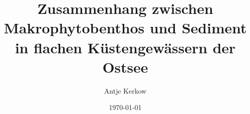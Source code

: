 



\pagestyle{empty}



\titlehead{Ernst Moritz Arndt Universität Greifswald\\
           Fachbereich Naturwissenschaften\\
           Institut für Landschaftsökologie und Naturschutz}

\subject{Diplomarbeit}

\title{Zusammenhang zwischen Makrophytobenthos und Sediment in flachen Küstengewässern der Ostsee}

\author{Antje Kerkow}

\date{\today} 

\publishers{Dozenten:\\PD Dr. Irmgard Blindow \\Prof. Dr. Hendrik Schubert}





\maketitle %
\clearpage


\pagestyle{scrheadings}    %
\clearscrheadfoot

\cfoot{\pagemark}
\chead{\headmark}


\tableofcontents

\newpage

\listoffigures

\listoftables

\newpage

